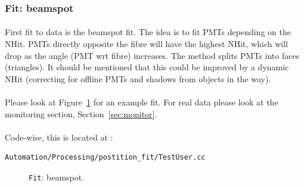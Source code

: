 \documentclass[12pt]{article}
\begin{document}
\subsubsection{Fit: beamspot}\label{subsub:bs}
\paragraph{}
First fit to data is the beamspot fit. The idea is to fit PMTs depending on the NHit. PMTs directly opposite the fibre will have the highest NHit, which will drop as the angle (PMT wrt fibre) increases. The method splits PMTs into faces (triangles). It should be mentioned that this could be improved by a dynamic NHit (correcting for offline PMTs and shadows from objects in the way).

\paragraph{}
Please look at Figure~\ref{fig:beamspot} for an example fit. For real data please look at the monitoring section, Section~\ref{sec:monitor}.

\paragraph{}
Code-wise, this is located at :
\begin{lstlisting}
Automation/Processing/postition_fit/TestUser.cc
\end{lstlisting}

\begin{figure}
\centering
\noindent{}
  \caption{\centering \texttt{Fit}: beamspot.\hspace{\textwidth}}
  \label{fig:beamspot}
\end{figure}
\end{document}
